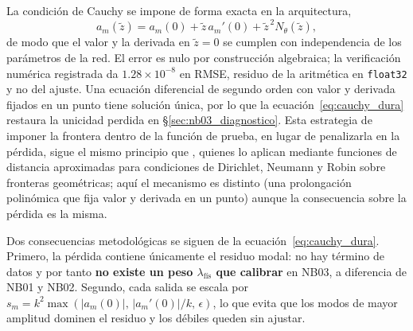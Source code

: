 La condición de Cauchy se impone de forma exacta en la arquitectura,
\begin{equation}
    a_m(\tilde z)=a_m(0)+\tilde z\,a_m'(0)+\tilde z^{\,2} N_\theta(\tilde z),
    \label{eq:cauchy_dura}
\end{equation}
de modo que el valor y la derivada en $\tilde z=0$ se cumplen con independencia
de los parámetros de la red. El error es nulo por construcción algebraica; la
verificación numérica registrada da $1.28\times10^{-8}$ en RMSE, residuo de la
aritmética en \texttt{float32} y no del ajuste. Una ecuación diferencial de segundo orden con valor y
derivada fijados en un punto tiene solución única, por lo que la
ecuación~\eqref{eq:cauchy_dura} restaura la unicidad perdida en
§\ref{sec:nb03_diagnostico}. Esta estrategia de imponer la frontera dentro de
la función de prueba, en lugar de penalizarla en la pérdida, sigue el mismo principio que \textcite{sukumar2022exact}, quienes
lo aplican mediante funciones de distancia aproximadas para condiciones de
Dirichlet, Neumann y Robin sobre fronteras geométricas; aquí el mecanismo es
distinto (una prolongación polinómica que fija valor y derivada en un punto)
aunque la consecuencia sobre la pérdida es la misma.

Dos consecuencias metodológicas se siguen de la ecuación~\eqref{eq:cauchy_dura}.
Primero, la pérdida contiene únicamente el residuo modal: no hay término de
datos y por tanto \textbf{no existe un peso $\lambda_\text{fís}$ que calibrar} en
NB03, a diferencia de NB01 y NB02. Segundo, cada salida se escala por
$s_m=k^2\max\left(|a_m(0)|,\,|a_m'(0)|/k,\,\epsilon\right)$, lo que evita que
los modos de mayor amplitud dominen el residuo y los débiles queden sin ajustar.


